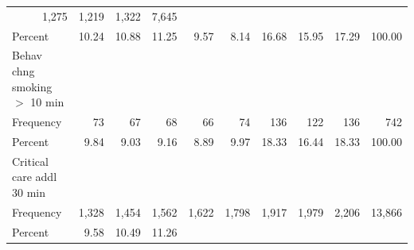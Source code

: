 \documentclass{article}
\begin{document}
\begin{table}[!h]
\begin{tabular}{llllllllll}
  \multicolumn{1}{r}{1,275} &
  \multicolumn{1}{r}{1,219} &
  \multicolumn{1}{r}{1,322} &
  \multicolumn{1}{r}{7,645} \\
\multicolumn{1}{l}{\hspace{2em}Percent} &
  \multicolumn{1}{|r}{10.24} &
  \multicolumn{1}{r}{10.88} &
  \multicolumn{1}{r}{11.25} &
  \multicolumn{1}{r}{9.57} &
  \multicolumn{1}{r}{8.14} &
  \multicolumn{1}{r}{16.68} &
  \multicolumn{1}{r}{15.95} &
  \multicolumn{1}{r}{17.29} &
  \multicolumn{1}{r}{100.00} \\
\multicolumn{1}{l}{\hspace{1em}Behav chng smoking $>$ 10 min} &
  \multicolumn{1}{|r}{} &
  \multicolumn{1}{r}{} &
  \multicolumn{1}{r}{} &
  \multicolumn{1}{r}{} &
  \multicolumn{1}{r}{} &
  \multicolumn{1}{r}{} &
  \multicolumn{1}{r}{} &
  \multicolumn{1}{r}{} &
  \multicolumn{1}{r}{} \\
\multicolumn{1}{l}{\hspace{2em}Frequency} &
  \multicolumn{1}{|r}{73} &
  \multicolumn{1}{r}{67} &
  \multicolumn{1}{r}{68} &
  \multicolumn{1}{r}{66} &
  \multicolumn{1}{r}{74} &
  \multicolumn{1}{r}{136} &
  \multicolumn{1}{r}{122} &
  \multicolumn{1}{r}{136} &
  \multicolumn{1}{r}{742} \\
\multicolumn{1}{l}{\hspace{2em}Percent} &
  \multicolumn{1}{|r}{9.84} &
  \multicolumn{1}{r}{9.03} &
  \multicolumn{1}{r}{9.16} &
  \multicolumn{1}{r}{8.89} &
  \multicolumn{1}{r}{9.97} &
  \multicolumn{1}{r}{18.33} &
  \multicolumn{1}{r}{16.44} &
  \multicolumn{1}{r}{18.33} &
  \multicolumn{1}{r}{100.00} \\
\multicolumn{1}{l}{\hspace{1em}Critical care addl 30 min} &
  \multicolumn{1}{|r}{} &
  \multicolumn{1}{r}{} &
  \multicolumn{1}{r}{} &
  \multicolumn{1}{r}{} &
  \multicolumn{1}{r}{} &
  \multicolumn{1}{r}{} &
  \multicolumn{1}{r}{} &
  \multicolumn{1}{r}{} &
  \multicolumn{1}{r}{} \\
\multicolumn{1}{l}{\hspace{2em}Frequency} &
  \multicolumn{1}{|r}{1,328} &
  \multicolumn{1}{r}{1,454} &
  \multicolumn{1}{r}{1,562} &
  \multicolumn{1}{r}{1,622} &
  \multicolumn{1}{r}{1,798} &
  \multicolumn{1}{r}{1,917} &
  \multicolumn{1}{r}{1,979} &
  \multicolumn{1}{r}{2,206} &
  \multicolumn{1}{r}{13,866} \\
\multicolumn{1}{l}{\hspace{2em}Percent} &
  \multicolumn{1}{|r}{9.58} &
  \multicolumn{1}{r}{10.49} &
  \multicolumn{1}{r}{11.26} &

\end{tabular}
\end{table}
\end{document}
